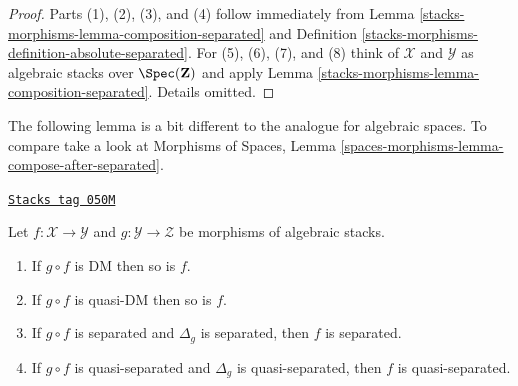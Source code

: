 \begin{proof}
Parts (1), (2), (3), and (4) follow immediately from
Lemma \ref{stacks-morphisms-lemma-composition-separated}
and
Definition \ref{stacks-morphisms-definition-absolute-separated}.
For (5), (6), (7), and (8) think of $\mathcal{X}$ and $\mathcal{Y}$ as
algebraic stacks over $\Spec(\mathbf{Z})$ and apply
Lemma \ref{stacks-morphisms-lemma-composition-separated}.
Details omitted.
\end{proof}

The following lemma is a bit different to the analogue for algebraic
spaces. To compare take a look at
Morphisms of Spaces,
Lemma \ref{spaces-morphisms-lemma-compose-after-separated}.

\begin{lemma}
\label{stacks-morphisms-lemma-compose-after-separated}
\href{https://stacks.math.columbia.edu/tag/050M}{\texttt{Stacks tag 050M}}

Let $f : \mathcal{X} \to \mathcal{Y}$ and
$g : \mathcal{Y} \to \mathcal{Z}$ be morphisms of algebraic stacks.
\begin{enumerate}
\item If $g \circ f$ is DM then so is $f$.
\item If $g \circ f$ is quasi-DM then so is $f$.
\item If $g \circ f$ is separated and $\Delta_g$ is separated, then
$f$ is separated.
\item If $g \circ f$ is quasi-separated and
$\Delta_g$ is quasi-separated, then $f$ is quasi-separated.
\end{enumerate}
\end{lemma}

